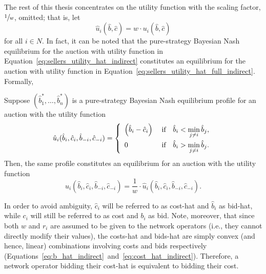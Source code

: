 The rest of this thesis concentrates on the utility function with the scaling factor, $\displaystyle\sfrac{1}{w}$, omitted; that is, let
\begin{equation}
  \label{eq:sellers_utility_hat_indirect}
    \hat{u}_i(\hat{b},\hat{c}) = w\cdot u_i(\hat{b}, \hat{c})
\end{equation}
for all $i\in N$. In fact, it can be noted that the pure-strategy Bayesian Nash equilibrium for the auction with utility function in Equation~\eqref{eq:sellers_utility_hat_indirect} constitutes an equilibrium for the auction with utility function in Equation~\eqref{eq:sellers_utility_hat_full_indirect}. Formally,
\begin{proposition}
\label{prop:equivalence_of_utilities_indirect}
Suppose $(\hat{b}_1^*, \ldots, \hat{b}_n^*)$ is a pure-strategy Bayesian Nash equilibrium profile for an auction with the utility function
\begin{equation}
  \hat{u}_i(\hat{b}_i,\hat{c}_i,\hat{b}_{-i},\hat{c}_{-i}) = \left\{
  \begin{array}{l l}
    \displaystyle\left(\hat{b}_i-\hat{c}_i\right) & \;\textrm{if}\quad\hat{b}_i < \displaystyle\min_{j\neq i}\hat{b}_j,\\[2ex]
    0 & \;\textrm{if}\quad\hat{b}_i > \displaystyle\min_{j\neq i}\hat{b}_j.
  \end{array}\right.
\end{equation}
Then, the same profile constitutes an equilibrium for an auction with the utility function
\begin{equation}
  u_i(\hat{b}_i,\hat{c}_i,\hat{b}_{-i},\hat{c}_{-i}) = \frac{1}{w}\cdot \hat{u}_i(\hat{b}_i,\hat{c}_i,\hat{b}_{-i},\hat{c}_{-i}).
\end{equation}
\end{proposition}

In order to avoid ambiguity, $\hat{c}_i$ will be referred to as cost-hat and $\hat{b}_i$ as bid-hat, while $c_i$ will still be referred to as cost and $b_i$ as bid. Note, moreover, that since both $w$ and $r_i$ are assumed to be given to the network operators (i.e., they cannot directly modify their values), the costs-hat and bids-hat are simply convex (and hence, linear) combinations involving costs and bids respectively (Equations~\eqref{eq:b_hat_indirect}~and~\eqref{eq:cost_hat_indirect}). Therefore, a network operator bidding their cost-hat is equivalent to bidding their cost.

